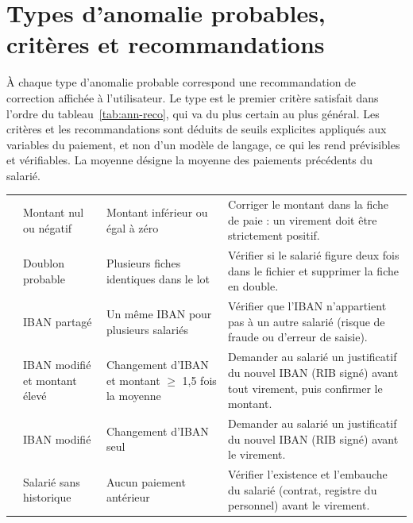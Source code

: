 \appendix

\chapter{Types d'anomalie probables, critères et recommandations}
\label{ann:recommandations}

À chaque type d'anomalie probable correspond une recommandation de correction affichée à l'utilisateur. Le type est le premier critère satisfait dans l'ordre du tableau~\ref{tab:ann-reco}, qui va du plus certain au plus général. Les critères et les recommandations sont déduits de seuils explicites appliqués aux variables du paiement, et non d'un modèle de langage, ce qui les rend prévisibles et vérifiables. La moyenne désigne la moyenne des paiements précédents du salarié.

\begin{table}[H]
\centering
\footnotesize
\renewcommand{\arraystretch}{1.15}
\tablestyle
\begin{tabularx}{\textwidth}{|>{\centering\arraybackslash}p{0.8cm}|>{\raggedright\arraybackslash}p{3.3cm}|>{\raggedright\arraybackslash}p{3.7cm}|Y|}
\hline
{} &  &  &  \\
 & Montant nul ou négatif & Montant inférieur ou égal à zéro & Corriger le montant dans la fiche de paie : un virement doit être strictement positif. \\
 & Doublon probable & Plusieurs fiches identiques dans le lot & Vérifier si le salarié figure deux fois dans le fichier et supprimer la fiche en double. \\
 & IBAN partagé & Un même IBAN pour plusieurs salariés & Vérifier que l'IBAN n'appartient pas à un autre salarié (risque de fraude ou d'erreur de saisie). \\
 & IBAN modifié et montant élevé & Changement d'IBAN et montant $\geq$ 1,5 fois la moyenne & Demander au salarié un justificatif du nouvel IBAN (RIB signé) avant tout virement, puis confirmer le montant. \\
 & IBAN modifié & Changement d'IBAN seul & Demander au salarié un justificatif du nouvel IBAN (RIB signé) avant le virement. \\
 & Salarié sans historique & Aucun paiement antérieur & Vérifier l'existence et l'embauche du salarié (contrat, registre du personnel) avant le virement. \\

\end{tabularx}
\end{table}

